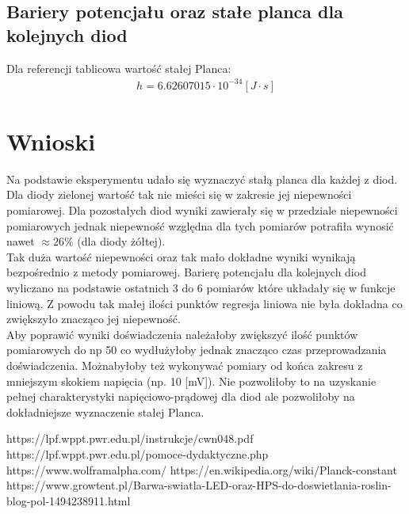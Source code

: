 \documentclass[11pt]{article}
\begin{document}
    \subsection*{Bariery potencjału oraz stałe planca dla kolejnych diod}
    Dla referencji tablicowa wartość stałej Planca:
    \begin{gather*}
        h=6.62607015\cdot 10^{-34}[J\cdot s]
    \end{gather*}
    \begin{center}
    \end{center}

    \section{Wnioski}
    \indent Na podstawie eksperymentu udało się wyznaczyć stałą planca dla każdej z diod.
    Dla diody zielonej wartość tak nie mieści się w zakresie jej niepewności pomiarowej.
    Dla pozostałych diod wyniki zawierały się w przedziale niepewności pomiarowych jednak niepewność względna
    dla tych pomiarów potrafiła wynosić nawet $\approx 26\%$ (dla diody żółtej).\\
    \indent Tak duża wartość niepewności oraz tak mało dokładne wyniki wynikają bezpośrednio z metody pomiarowej.
    Barierę potencjału dla kolejnych diod wyliczano na podstawie ostatnich 3 do 6 pomiarów które układały się w funkcje liniową.
    Z powodu tak małej ilości punktów regresja liniowa nie była dokładna co zwiększyło znacząco jej niepewność.\\
    \indent Aby poprawić wyniki doświadczenia należałoby zwiększyć ilość punktów pomiarowych do np 50 co wydłużyłoby jednak znacząco
    czas przeprowadzania doświadczenia. Możnabyłoby też wykonywać pomiary od końca zakresu z mniejszym skokiem napięcia
    (np. 10 [mV]). Nie pozwoliłoby to na uzyskanie pełnej charakterystyki napięciowo-prądowej dla diod ale pozwoliłoby
    na dokładniejsze wyznaczenie stałej Planca.

    \vfill
    \footnotesize
    \begin{thebibliography}{9}
        https://lpf.wppt.pwr.edu.pl/instrukcje/cwn048.pdf
        https://lpf.wppt.pwr.edu.pl/pomoce-dydaktyczne.php
        https://www.wolframalpha.com/
        https://en.wikipedia.org/wiki/Planck-constant
        https://www.growtent.pl/Barwa-swiatla-LED-oraz-HPS-do-doswietlania-roslin-blog-pol-1494238911.html
    \end{thebibliography}
\end{document}
